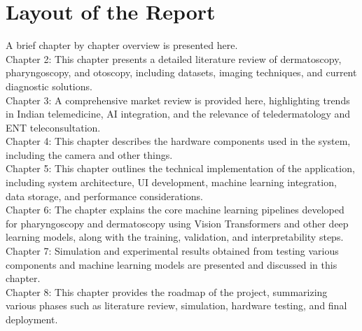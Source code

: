 \section{Layout of the Report} 
A brief chapter by chapter overview is presented here.\\

Chapter 2: This chapter presents a detailed literature review of dermatoscopy, pharyngoscopy, and otoscopy, including datasets, imaging techniques, and current diagnostic solutions.\\

Chapter 3: A comprehensive market review is provided here, highlighting trends in Indian telemedicine, AI integration, and the relevance of teledermatology and ENT teleconsultation.\\

Chapter 4: This chapter describes the hardware components used in the system, including the camera and other things.\\

Chapter 5: This chapter outlines the technical implementation of the application, including system architecture, UI development, machine learning integration, data storage, and performance considerations.\\

Chapter 6: The chapter explains the core machine learning pipelines developed for pharyngoscopy and dermatoscopy using Vision Transformers and other deep learning models, along with the training, validation, and interpretability steps.\\

Chapter 7: Simulation and experimental results obtained from testing various components and machine learning models are presented and discussed in this chapter.\\

Chapter 8: This chapter provides the roadmap of the project, summarizing various phases such as literature review, simulation, hardware testing, and final deployment.\\


